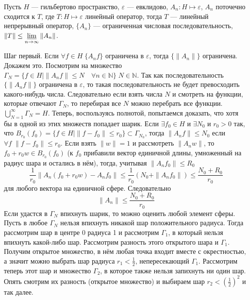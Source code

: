 \documentclass[12pt]{article}
\begin{document}
\begin{Theor}
    Пусть $H$ --- гильбертово пространство, $\varepsilon$ --- евклидово, $A_n : H \mapsto \varepsilon$, $A_n$ поточечно сходится к $T$,
    где $T : H \mapsto \varepsilon$
    линейный оператор, тогда $T$ --- линейный непрерывный оператор, $\{A_n\}$ --- ограниченная числовая последовательность, $\|T\| \le \varliminf\limits_
    {n\to \infty}\|A_n\|$.
\end{Theor}
\begin{Proof}
    Шаг первый. Если $\forall f \in H\; \{A_nf\}$ ограничена в $\varepsilon$, тогда $\{\|A_n\|\}$ ограничена.
    Докажем это.
    Посмотрим на множество $\Gamma_N = \{f \in H \mid \|A_n f\| \le N \quad \forall n \in \mathbb N\}\; N \in \mathbb N$.
    Так как последовательность $\{\|A_nf\|\}$ ограничена в $\varepsilon$, то такая последовательность не будет превосходить какого-нибудь числа.
    Следовательно если взять числа $N$ и смотреть на функции, которые отвечают $\Gamma_N$, то перебирая все $N$ можно перебрать все функции.
    $\bigcup\limits_{N = 1}^\infty \Gamma_N = H$.
    Теперь, воспользуясь полнотой, попытаемся доказать, что хотя бы в одной из этих множеств попадает шарик.
    Если $\exists f_0 \in H$ и $\exists N_0$ и $r_0 > 0$ так, что $B_{r_0}(f_0)=\{f \in H \mid \|f - f_0\| \le r_0\} \subset \Gamma_{N_0}$, тогда $\|A_n f\| \le N_0$
    если $\forall f\; \|f - f_0\| \le r_0$.
    Если взять $\|w\| = 1$ и рассмотреть $\|A_n w\|$, то $f_0 + r_0 w \in B_{r_0}(f_0)$ (к $f_0$ прибавили вектор единичной длины, умноженный на радиус шара
    и остались в нём), тогда, учитывая $\|A_n f_0\| \le R_0$
    $$
    \frac{1}{r_0}\|A_n(f_0 + r_0 w) - A_n f_0\| \le \frac{1}{r_0}(N_0 + \|A_n f_0\|)\le \frac{N_0 + R_0}{r_0}
    $$
    для любого вектора на единичной сфере.
    Следовательно 
    $$
    \|A_n\| \le \frac{N_0 + R_0}{r_0}
    $$
    Если удастся в $\Gamma_N$ впихнуть шарик, то можно оценить любой элемент сферы.
    Пусть в любое $\Gamma_N$ нельзя впихнуть никакой шар положительного радиуса.
    Тогда рассмотрим шар в центре 0 радиуса 1 и рассмотрим $\Gamma_1$, в который нельзя впихнуть какой-либо шар.
    Рассмотрим разность этого открытого шара и $\Gamma_1$.
    Получим открытое множество, в нём любая точка входит вместе с окрестностью, а значит можно выбрать шар радиуса $r_1 < \frac12$, непересекающий $\Gamma_1$.
    Рассмотрим теперь этот шар и множество $\Gamma_2$, в которое также нельзя запихнуть ни один шар.
    Опять смотрим их разность (открытое множество) и выбираем шар $r_2 < \left(\frac12\right)^2$ и так далее.

\end{Proof}
\end{document}
